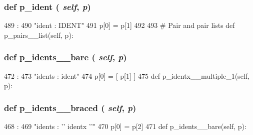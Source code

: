 \begin{DoxyVerb}
{\subsubsection[{p\_\-ident}]{\setlength{\rightskip}{0pt plus 5cm}def p\_\-ident ( {\em self}, \/   {\em p})}}
\label{classslicc_1_1parser_1_1SLICC_ac6953139e7912e8b74f9cc2ebe2befd7}



\begin{DoxyCode}
489                         :
490         "ident : IDENT"
491         p[0] = p[1]
492 
493     # Pair and pair lists
    def p_pairs__list(self, p):
\end{DoxyCode}
\hypertarget{classslicc_1_1parser_1_1SLICC_a5ef77afd28d0d329c16998601cccb68f}{
\subsubsection[{p\_\-idents\_\-\_\-bare}]{\setlength{\rightskip}{0pt plus 5cm}def p\_\-idents\_\-\_\-bare ( {\em self}, \/   {\em p})}}
\label{classslicc_1_1parser_1_1SLICC_a5ef77afd28d0d329c16998601cccb68f}



\begin{DoxyCode}
472                                :
473         "idents : ident"
474         p[0] = [ p[1] ]
475 
    def p_identx__multiple_1(self, p):
\end{DoxyCode}
\hypertarget{classslicc_1_1parser_1_1SLICC_ad02a597e711c93ec857187e3ca25b187}{
\subsubsection[{p\_\-idents\_\-\_\-braced}]{\setlength{\rightskip}{0pt plus 5cm}def p\_\-idents\_\-\_\-braced ( {\em self}, \/   {\em p})}}
\label{classslicc_1_1parser_1_1SLICC_ad02a597e711c93ec857187e3ca25b187}



\begin{DoxyCode}
468                                  :
469         "idents : '{' identx '}'"
470         p[0] = p[2]
471 
    def p_idents__bare(self, p):
\end{DoxyCode}
\hypertarget{classslicc_1_1parser_1_1SLICC_a6344d2871d9bb2fde5d940b92dbb8fd6}{
}
\end{DoxyVerb}

